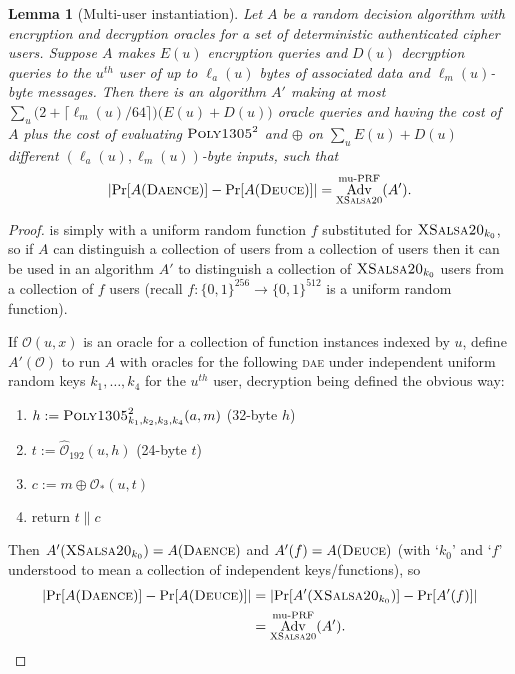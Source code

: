 \documentclass[draft]{article}
\newtheorem{lemma}{Lemma}
\def\operatorsc#1{{%
  \ifmmode\let\next=\operatorname\else\let\next=\relax\fi\next{\textsc{#1}}}}
\def\XSalsa#1/{\operatorsc{XSalsa#1}}
\def\Poly#1/{\operatorsc{Poly#1}}
\def\Daence/{\operatorsc{Daence}}
\def\Deuce/{\operatorsc{Deuce}}
\def\muPRF{%
  \ifmmode\def\next{\operatorname{mu-PRF}}%
    \else\def\next/{mu-\textsc{prf}}%
  \fi\next}
\def\DAE{%
  \ifmmode\def\next{\operatorname{DAE}}%
    \else\def\next/{\textsc{dae}}%
  \fi\next}
\DeclareMathOperator{\Adv}{Adv}
\newcommand{\concat}{\mathbin\|}
\begin{document}
\begin{lemma}[Multi-user instantiation]\label{lem-mu-instance}
  Let $A$ be a random decision algorithm with encryption and
   decryption oracles for a \emph{set} of deterministic authenticated
   cipher users.
  Suppose $A$ makes $E(u)$ encryption queries and $D(u)$ decryption
   queries to the $u^{\mathit{th}}$ user of up to $\ell_a(u)$ bytes of
   associated data and $\ell_m(u)$-byte messages.
  Then there is an algorithm $A'$ making at most
   $\sum_u \bigl(2 + \lceil\ell_m(u)/64\rceil\bigr)
     \bigl(E(u) + D(u)\bigr)$
   oracle queries and having the cost of $A$ plus the cost of
   evaluating $\Poly1305/^2$ and $\oplus$ on
   $\sum_u E(u) + D(u)$
   different $(\ell_a(u), \ell_m(u))$-byte inputs,
   such that
  \[
    \lvert\Pr[A(\Daence/)] - \Pr[A(\Deuce/)]\rvert
    = \Adv^{\muPRF}_{\XSalsa20/}(A').
  \]
\end{lemma}

\begin{proof}
  \Deuce/ is simply \Daence/ with a uniform random function $f$
   substituted for $\XSalsa20/_{k_0}$, so if $A$ can distinguish a
   collection of \Daence/ users from a collection of \Deuce/ users then
   it can be used in an algorithm $A'$ to distinguish a collection of
   $\XSalsa20/_{k_0}$ users from a collection of $f$ users (recall
   $f\colon \{0,1\}^{256} \to \{0,1\}^{512}$ is a
   uniform random function).

  If $\mathcal O(u,x)$ is an oracle for a collection of function
   instances indexed by $u$, define $A'(\mathcal O)$ to run $A$ with
   oracles for the following \DAE/ under independent uniform random keys
   $k_1,\dotsc,k_4$ for the $u^{\mathit{th}}$ user, decryption being
   defined the obvious way:
%
  \begin{enumerate}
    \item $h := \Poly1305/^2_{k_1,k_2,k_3,k_4}(a, m)$
      \hfill (32-byte $h$)
    \item $t := \hat{\mathcal O}_{192}(u, h)$
      \hfill (24-byte $t$)
    \item $c := m \oplus \mathcal O_*(u, t)$
    \item return $t \concat c$
  \end{enumerate}
%
  Then $A'(\XSalsa20/_{k_0}) = A(\Daence/)$ and $A'(f) = A(\Deuce/)$
   (with `$k_0$' and `$f$' understood to mean a collection of
   independent keys/functions), so
  \begin{align*}
    \lvert\Pr[A(\Daence/)] - \Pr[A(\Deuce/)]\rvert
    &= \lvert\Pr[A'(\XSalsa20/_{k_0})] - \Pr[A'(f)]\rvert \\
    &= \Adv^{\muPRF}_{\XSalsa20/}(A').
    \qedhere
  \end{align*}
\end{proof}

\end{document}
